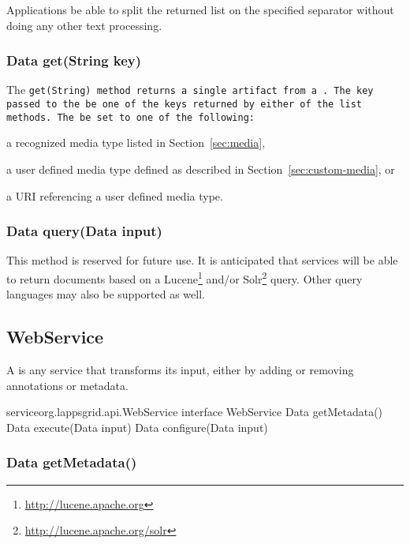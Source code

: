 Applications \must be able to split the returned list on the specified separator without doing any other text processing.

\subsubsection{Data get(String key)}

The \tt{get(String)} method returns a single artifact from a \source.  The key passed to the \source \must be one of the keys returned by either of the \tt{list} methods. The \discriminator \must be set to one of the following:
\begin{listing}
\item a recognized media type listed in Section~\ref{sec:media},
\item a user defined media type defined as described in Section~\ref{sec:custom-media}, or
\item a URI referencing a user defined media type.
\end{listing}

\subsubsection{Data query(Data input)}

This method is reserved for future use.  It is anticipated that \source services will be able to return documents based on a Lucene\footnote{\url{http://lucene.apache.org}} and/or Solr\footnote{\url{http://lucene.apache.org/solr}} query.  Other query languages may also be supported as well.



\subsection{WebService}\label{sub:WebService}

A \service is any service that transforms its input, either by adding or removing annotations or metadata.

\begin{groovy}{service}{org.lappsgrid.api.WebService}
	interface WebService {
		Data getMetadata()
		Data execute(Data input)
		Data configure(Data input)
	}
\end{groovy}

\subsubsection{Data getMetadata()}

